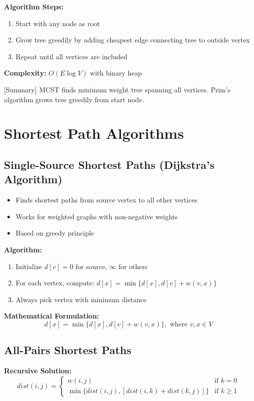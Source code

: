 \documentclass[12pt]{article}
\begin{document}
\textbf{Algorithm Steps:}
\begin{enumerate}
    \item Start with any node as root
    \item Grow tree greedily by adding cheapest edge connecting tree to outside vertex
    \item Repeat until all vertices are included
\end{enumerate}

\textbf{Complexity:} $O(E \log V)$ with binary heap

    [Summary] MCST finds minimum weight tree spanning all vertices. Prim's algorithm grows tree greedily from start node.

\section{Shortest Path Algorithms}

\subsection{Single-Source Shortest Paths (Dijkstra's Algorithm)}

\begin{itemize}
    \item Finds shortest paths from source vertex to all other vertices
    \item Works for weighted graphs with non-negative weights
    \item Based on greedy principle
\end{itemize}

\textbf{Algorithm:}
\begin{enumerate}
    \item Initialize $d[v] = 0$ for source, $\infty$ for others
    \item For each vertex, compute: $d[x] = \min\{d[x], d[v] + w(v,x)\}$
    \item Always pick vertex with minimum distance
\end{enumerate}

\textbf{Mathematical Formulation:}
\[
    d[x] = \min \{d[x], d[v] + w(v,x)\}, \text{ where } v,x \in V
\]

\subsection{All-Pairs Shortest Paths}

\textbf{Recursive Solution:}
\[
    dist(i, j) =
    \begin{cases}
        w(i, j)                                       & \text{if } k = 0    \\
        \min\{dist(i, j), [dist(i, k) + dist(k, j)]\} & \text{if } k \geq 1
    \end{cases}
\]
\end{document}
